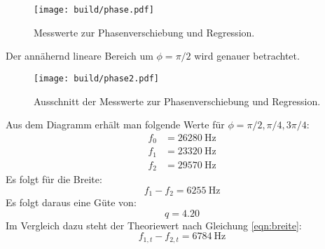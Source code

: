 \begin{figure}[H]
    \centering
    \caption{Messwerte zur Phasenverschiebung und Regression.}
    \label{fig:phase}
    \texttt{[image: build/phase.pdf]}
\end{figure}
\noindent
Der annähernd lineare Bereich um $\phi=\pi/2$ wird genauer betrachtet.
\begin{figure}[H]
    \centering
    \caption{Ausschnitt der Messwerte zur Phasenverschiebung und Regression.}
    \label{fig:phase2}
    \texttt{[image: build/phase2.pdf]}
\end{figure}
\noindent
Aus dem Diagramm erhält man folgende Werte für $\phi=\pi/2, \pi/4, 3\pi/4$:
\begin{align}
    f_0 &= \SI{26280}{\hertz} \\
    f_1 &= \SI{23320}{\hertz} \\
    f_2 &= \SI{29570}{\hertz}
\end{align}
Es folgt für die Breite:
\begin{equation}
    f_1-f_2 = \SI{6255}{\hertz}
\end{equation}
Es folgt daraus eine Güte von:
\begin{equation}
    q=4.20
\end{equation}
Im Vergleich dazu steht der Theoriewert nach Gleichung \eqref{eqn:breite}:
\begin{equation}
    f_{1,t}-f_{2,t} = \SI{6784}{\hertz}
\end{equation}
%
